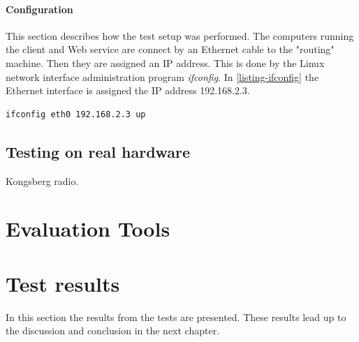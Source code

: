 \paragraph{Configuration}

This section describes how the test setup was performed. The computers running
the client and Web service are connect by an Ethernet cable to the "routing"
machine. Then they are assigned an IP address. This is done by the Linux network
interface administration program \textit{ifconfig}. In \cref{listing-ifconfig}
the Ethernet interface is assigned the IP address 192.168.2.3.

\begin{lstlisting}[frame=single, caption="Configuring a network interface", label=listing-ifconfig]
ifconfig eth0 192.168.2.3 up

\end{lstlisting}


\subsection{Testing on real hardware}
Kongsberg radio.


\section{Evaluation Tools}

\section{Test results}

In this section the results from the tests are presented. These results lead up to the discussion and conclusion in the next chapter.
